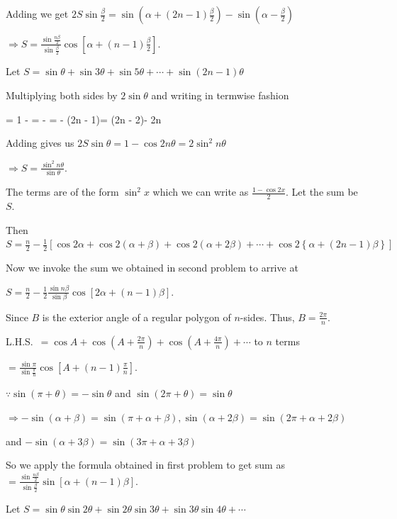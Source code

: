   Adding we get $2S\sin\frac{\beta}{2} = \sin\left(\alpha + (2n - 1)\frac{\beta}{2}\right) -
  \sin\left(\alpha - \frac{\beta}{2}\right)$

  $\Rightarrow S = \frac{\sin\frac{n\beta}{2}}{\sin\frac{\beta}{2}}\cos\left[\alpha + (n -
    1)\frac{\beta}{2}\right]$.
\item Let $S = \sin\theta + \sin3\theta + \sin5\theta + \cdots + \sin(2n - 1)\theta$

  Multiplying both sides by $2\sin\theta$ and writing in termwise fashion

  \startformula\startalign
    \sin\theta\sin\theta \NC = 1 - \theta\NR
    \sin\theta{}\theta \NC = \theta - \theta\NR
    \sin\theta{}\theta \NC = \theta - \theta\NR
    \NC \NC \cdots\NR
    \sin\theta\sin(2n - 1)\theta \NC = \cos(2n - 2)\theta - \cos2n\theta\NR
  \stopalign\stopformula

  Adding gives us $2S\sin\theta = 1 - \cos2n\theta = 2\sin^2n\theta$

  $\Rightarrow S = \frac{\sin^2n\theta}{\sin\theta}$.
\item The terms are of the form $\sin^2x$ which we can write as $\frac{1 - \cos2x}{2}$. Let the sum be $S$.

  Then $S = \frac{n}{2} - \frac{1}{2}\left[\cos2\alpha + \cos2(\alpha + \beta) + \cos2(\alpha + 2\beta) +
    \cdots + \cos2\left\{\alpha + (2n - 1)\beta\right\}\right]$

  Now we invoke the sum we obtained in second problem to arrive at

  $S = \frac{n}{2} - \frac{1}{2}\frac{\sin n\beta}{\sin\beta}\cos[2\alpha + (n - 1)\beta]$.
\item Since $B$ is the exterior angle of a regular polygon of $n$-sides. Thus, $B = \frac{2\pi}{n}$.

  L.H.S.\ $= \cos A + \cos\left(A + \frac{2\pi}{n}\right) + \cos\left(A + \frac{4\pi}{n}\right) + \cdots$ to
  $n$ terms

  $= \frac{\sin\pi}{\sin\frac{\pi}{n}}\cos\left[A + (n - 1)\frac{\pi}{n}\right]$.
\item $\because \sin(\pi + \theta) = -\sin\theta$ and $\sin(2\pi + \theta) = \sin\theta$

  $\Rightarrow -\sin(\alpha + \beta) = \sin(\pi + \alpha + \beta), \sin(\alpha + 2\beta) = \sin(2\pi +
  \alpha + 2\beta)$

  and $-\sin(\alpha + 3\beta) = \sin(3\pi + \alpha + 3\beta)$

  So we apply the formula obtained in first problem to get sum as $=
  \frac{\sin\frac{n\beta}{2}}{\sin\frac{\beta}{2}}\sin[\alpha + (n - 1)\beta]$.
\item Let $S = \sin\theta\sin2\theta + \sin2\theta\sin3\theta + \sin3\theta\sin4\theta + \cdots$

